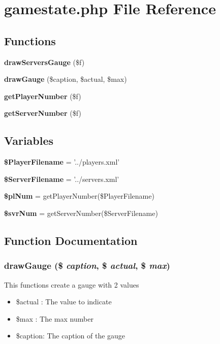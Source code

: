 \section{gamestate.php File Reference}
\label{gamestate_8php}


\subsection*{Functions}
\begin{CompactItemize}
\item 
{\bf draw\-Servers\-Gauge} (\$f)
\item 
{\bf draw\-Gauge} (\$caption, \$actual, \$max)
\item 
{\bf get\-Player\-Number} (\$f)
\item 
{\bf get\-Server\-Number} (\$f)
\end{CompactItemize}
\subsection*{Variables}
\begin{CompactItemize}
\item 
{\bf \$Player\-Filename} = '../players.xml'
\item 
{\bf \$Server\-Filename} = '../servers.xml'
\item 
{\bf \$pl\-Num} = get\-Player\-Number(\$Player\-Filename)
\item 
{\bf \$svr\-Num} = get\-Server\-Number(\$Server\-Filename)
\end{CompactItemize}


\subsection{Function Documentation}
\subsubsection{\setlength{\rightskip}{0pt plus 5cm}draw\-Gauge (\$ {\em caption}, \$ {\em actual}, \$ {\em max})}\label{gamestate_8php_3c04d1c808721c741013f290fdf6a501}


This functions create a gauge with 2 values\begin{itemize}
\item \$actual : The value to indicate\item \$max : The max number\item \$caption: The caption of the gauge\end{itemize}


